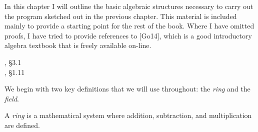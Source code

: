 

\begin{comment}
The author of a mathematics text, really any text in a technical
subject, is faced with a difficult choice --- how much to leave out?
How often to refer readers to references?  How much knowledge
to presuppose?

Now, in the early twenty-first century, we are faced with
technological changes that affect the author's approach.  First, we
have the ability to distribute very large books, file size being a
slight or absent impediment.  Also, we have a political and economic
structure that relies heavily on using copyright to restrict and
control information flow.  These factor have influenced me to decide
in favor of writing a larger and more comprehensive text, that aims to
introduce abstract algebra as much it tries to teach integration
theory.
\end{comment}

In this chapter I will outline the basic algebraic structures
necessary to carry out the program sketched out in the previous
chapter.  This material is included mainly to provide a starting point
for the rest of the book.  Where I have omitted proofs, I have tried
to provide references to [Go14], which is a good introductory algebra
textbook that is freely available on-line.


, \S3.1
\\
\qquad [Go14], \S1.11

We begin with two key definitions that we will use throughout: the
{\it ring} and the {\it field}.

\begin{comment}
Both rings and fields are defined over sets with two binary operators,
conventionally called addition and multiplication.  It will appease
the nervous reader to know that for our purposes,
addition is addition and multiplication is multiplication --- the same
addition and multiplication we learned in grade school.  Of
course, in the general case, any pair of operations that obey the
axioms will suffice to form a ring or a field, but we won't need to
concern ourselves with this.
\end{comment}

\begin{key point}
A {\it ring} is a mathematical system where addition,
subtraction, and multiplication are defined.
\end{key point}

